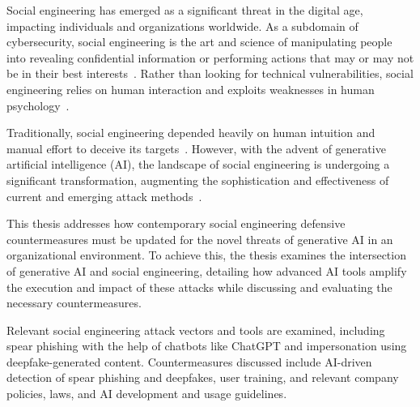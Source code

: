 %
%
Social engineering has emerged as a significant threat in the digital age, impacting individuals and organizations worldwide. As a subdomain of cybersecurity, social engineering is the art and science of manipulating people into revealing confidential information or performing actions that may or may not be in their best interests~\citep{hadnagy_Social_Engineering_The_Science_2018}. Rather than looking for technical vulnerabilities, social engineering relies on human interaction and exploits weaknesses in human psychology~\citep{wang_Defining_Social_Engineering_2020}.





%
%
Traditionally, social engineering depended heavily on human intuition and manual effort to deceive its targets~\citep{mitnick_The_Art_of_Deception_2003, mirsky_Threat_Offensive_AI_Organizations_2023}. However, with the advent of generative artificial intelligence (AI), the landscape of social engineering is undergoing a significant transformation, augmenting the sophistication and effectiveness of current and emerging attack methods~\citep{fakhouri_AI_Driven_Solutions_SE_Attacks_2024}.







%
%
This thesis addresses how contemporary social engineering defensive countermeasures must be updated for the novel threats of generative AI in an organizational environment. To achieve this, the thesis examines the intersection of generative AI and social engineering, detailing how advanced AI tools amplify the execution and impact of these attacks while discussing and evaluating the necessary countermeasures.





%
%
Relevant social engineering attack vectors and tools are examined, including spear phishing with the help of chatbots like ChatGPT and impersonation using deepfake-generated content. Countermeasures discussed include AI-driven detection of spear phishing and deepfakes, user training, and relevant company policies, laws, and AI development and usage guidelines.





